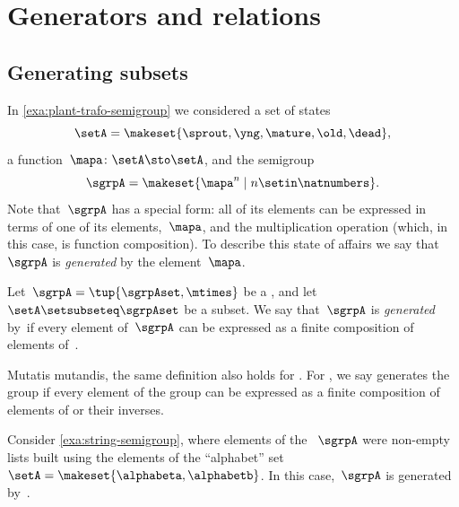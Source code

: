 
\section{Generators and relations}


\subsection{Generating subsets}

In \cref{exa:plant-trafo-semigroup} we considered a set of states
%
\begin{equation}
    \setA= \makeset{ \sprout, \yng, \mature, \old, \dead },
\end{equation}
%
a function~$\mapa \colon \setA \sto \setA$, and the semigroup
%
\begin{equation}
    \label{eq:trafo-sgrp-one-gen}
    \sgrpA = \makeset{ \mapa^n \mid n \setin \natnumbers }.
\end{equation}
%
Note that~$\sgrpA$ has a special form: all of its elements can be expressed in terms of one of its elements,~$\mapa$, and the multiplication operation (which, in this case, is function composition).
To describe this state of affairs we say that~$\sgrpA$ is \emph{generated} by the element~$\mapa$.

\begin{ctdefinition}
    \label{def:gen-semigrp}
    Let~$\sgrpA = \tup{\sgrpAset, \mtimes}$ be a , and let~$\setA \setsubseteq \sgrpAset$ be a subset.
    We say that~$\sgrpA$ is \emph{generated} by~\setA if every element of~$\sgrpA$ can be expressed as a finite composition of elements of~\setA.
\end{ctdefinition}

\begin{remark}
    Mutatis mutandis, the same definition also holds for .
    For , we say \setA generates the group if every element of the group can be expressed as a finite composition of elements of \setA or their inverses.
\end{remark}

\begin{example}
    Consider \cref{exa:string-semigroup}, where elements of the ~$\sgrpA$ were non-empty lists built using the elements of the ``alphabet'' set~$\setA = \makeset{ \alphabeta, \alphabetb}$.
    In this case,~$\sgrpA$ is generated by~\setA.
\end{example}


